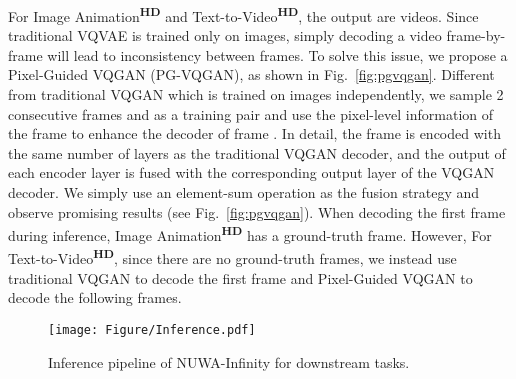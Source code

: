 \documentclass{article}
\begin{document}
For Image Animation\textsuperscript{\textbf{HD}} and Text-to-Video\textsuperscript{\textbf{HD}}, the output are videos. Since traditional VQVAE is trained only on images, simply decoding a video frame-by-frame will lead to inconsistency between frames. To solve this issue, we propose a Pixel-Guided VQGAN (PG-VQGAN), as shown in Fig.~\ref{fig:pgvqgan}. Different from traditional VQGAN which is trained on images independently, we sample 2 consecutive frames  and  as a training pair and use the pixel-level information of the  frame to enhance the decoder of frame . In detail, the frame  is encoded with the same number of layers as the traditional VQGAN decoder, and the output of each encoder layer is fused with the corresponding output layer of the VQGAN decoder. We simply use an element-sum operation as the fusion strategy and observe promising results (see Fig.~\ref{fig:pgvqgan}). 
When decoding the first frame during inference, Image Animation\textsuperscript{\textbf{HD}} has a ground-truth  frame. However, 
For Text-to-Video\textsuperscript{\textbf{HD}}, since there are no ground-truth frames, we instead use traditional VQGAN to decode the first frame and Pixel-Guided VQGAN to decode the following frames.













 \begin{figure}[tbp]
    \centering
    \texttt{[image: Figure/Inference.pdf]}
    \caption{Inference pipeline of NUWA-Infinity for downstream tasks.}
    \label{fig:inference}
    \vspace{-4mm}
\end{figure}
\end{document}
